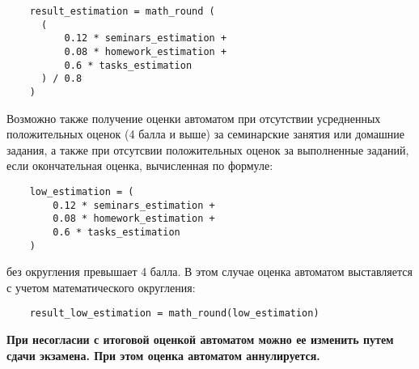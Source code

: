 \documentclass[a4paper, 12pt, oneside]{article}
\begin{document}
\begin{verbatim}
    result_estimation = math_round (
      (
          0.12 * seminars_estimation +
          0.08 * homework_estimation +
          0.6 * tasks_estimation
      ) / 0.8
    )
\end{verbatim}

Возможно также получение оценки автоматом при отсутствии усредненных положительных оценок (4 балла и выше) за семинарские занятия или домашние задания, а также при отсутсвии положительных оценок за выполненные заданий, если окончательная оценка, вычисленная по формуле:
\begin{verbatim}
    low_estimation = (
        0.12 * seminars_estimation +
        0.08 * homework_estimation +
        0.6 * tasks_estimation
    )
\end{verbatim}
без округления превышает 4 балла. В этом случае оценка автоматом выставляется с учетом математического округления:
\begin{verbatim}
    result_low_estimation = math_round(low_estimation)
\end{verbatim}

\textbf{При несогласии с итоговой оценкой автоматом можно ее изменить путем сдачи экзамена.  При этом оценка автоматом аннулируется.}
\end{document}
